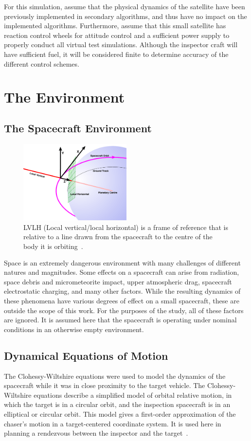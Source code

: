\documentclass[journal, 10pt]{IEEEtran}
\begin{document}
For this simulation, assume that the physical dynamics of the satellite have been previously implemented in secondary algorithms, and thus have no impact on the implemented algorithms. Furthermore, assume that this small satellite has reaction control wheels for attitude control and a sufficient power supply to properly conduct all virtual test simulations.  Although the inspector craft will have sufficient fuel, it will be considered finite to determine accuracy of the different control schemes.

\section{The Environment}
\subsection{The Spacecraft Environment}
\begin{figure}[tb]
\begin{center}
\includegraphics[width=0.5\textwidth]{figures/lvlh.png}
\caption{LVLH (Local vertical/local horizontal) is a frame of reference that is relative to a line drawn from the spacecraft to the centre of the body it is orbiting~\cite{lvlh}.}
\label{lvlh_diagram}
\end{center}
\end{figure}

Space is an extremely dangerous environment with many challenges of different natures and magnitudes. Some effects on a spacecraft can arise from radiation, space debris and micrometeorite impact, upper atmospheric drag, spacecraft electrostatic charging, and many other factors. While the resulting dynamics of these phenomena have various degrees of effect on a small spacecraft, these are outside the scope of this work. For the purposes of the study, all of these factors are ignored. It is assumed here that the spacecraft is operating under nominal conditions in an otherwise empty environment.

\subsection{Dynamical Equations of Motion} \label{cweqs}
The Clohessy-Wiltshire equations were used to model the dynamics of the spacecraft while it was in close proximity to the target vehicle. The Clohessy-Wiltshire equations describe a simplified model of orbital relative motion, in which the target is in a circular orbit, and the inspection spacecraft is in an elliptical or circular orbit. This model gives a first-order approximation of the chaser's motion in a target-centered coordinate system. It is used here in planning a rendezvous between the inspector and the target~\cite{cw_eqs}.
\end{document}
